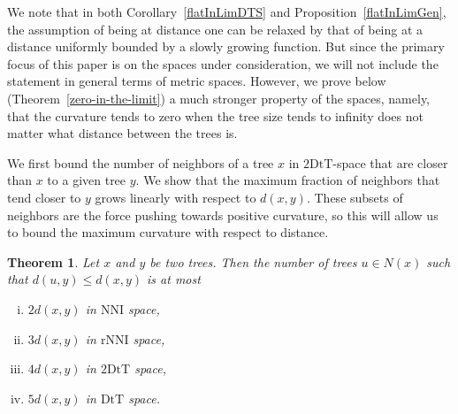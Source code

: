 \documentclass{amsart}
\newtheorem{theorem}[lemma]{Theorem}
\theoremstyle{definition}
\newcommand{\dts}{\mathrm{2DtT}}
\newcommand{\nni}{\mathrm{NNI}}
\newcommand{\rnni}{\mathrm{rNNI}}
\newcommand{\mdts}{\mathrm{DtT}}
\begin{document}
We note that in both Corollary~\ref{flatInLimDTS} and Proposition~\ref{flatInLimGen}, the assumption of being at distance one can be relaxed by that of being at a distance uniformly bounded by a slowly growing function.
But since the primary focus of this paper is on the spaces under consideration, we will not  include the statement in general terms of metric spaces.
However, we prove below (Theorem~\ref{zero-in-the-limit}) a much stronger property of the spaces, namely, that the curvature tends to zero when the tree size tends to infinity does not matter what distance between the trees is.

We first bound the number of neighbors of a tree $x$ in $\dts$-space that are closer than $x$ to a given tree $y$.
We show that the maximum fraction of neighbors that tend closer to $y$ grows linearly with respect to $d(x,y)$.
These subsets of neighbors are the force pushing towards positive curvature, so this will allow us to bound the maximum curvature with respect to distance.

\begin{theorem}
\label{max_good_neighbours}
Let $x$ and $y$ be two trees.
Then the number of trees $u \in N(x)$ such that $d(u, y) \le d(x, y)$ is at most
\begin{enumerate}[(i)]
\item $2d(x,y)$ in $\nni$ space,
\item $3d(x,y)$ in $\rnni$ space,
\item $4d(x,y)$ in $\dts$ space,
\item $5d(x,y)$ in $\mdts$ space.
\end{enumerate}
\end{theorem}
\end{document}
